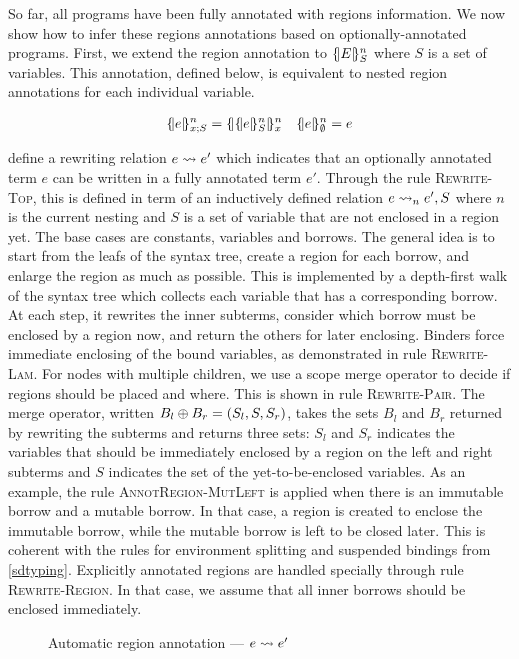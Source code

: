 So far, all \lang programs have been fully annotated with regions information.
We now show how to infer these regions annotations based on
optionally-annotated programs.
First, we extend the region annotation to $\region{S}{E}$ where $S$ is
a set of variables. This annotation, defined below, is equivalent to nested
region annotations for each individual variable.

\begin{align*}
  \region{x;S}{e} &= \region{x}{\region{S}{e}}& \region{\emptyset}{e} &= e\\
\end{align*}

 define a rewriting relation $\RannotT{e}{e'}$
which indicates that an optionally annotated term $e$ can be written
in a fully annotated term $e'$.
Through the rule \textsc{Rewrite-Top}, this is defined
in term of an inductively defined relation
$\Rannot{e}{e'}{S}$ where $n$ is the current nesting and $S$ is a set of
variable that are not enclosed in a region yet.
The base cases are constants, variables and borrows.
The general idea is to start from the leafs of the syntax tree, create a
region for each borrow, and enlarge the region as much as possible.
This is implemented by a depth-first walk of the syntax
tree which collects each variable that has a corresponding borrow.
At each step, it rewrites the inner subterms,
consider which borrow must be enclosed by a region now, and
return the others for later enclosing. Binders force immediate
enclosing of the bound variables, as demonstrated in rule \textsc{Rewrite-Lam}.
For nodes with multiple children, we
use a scope merge operator to decide if regions should be placed and where.
This is shown in rule \textsc{Rewrite-Pair}.
The merge operator, written $\getBorrows{B_l}{B_r}{(S_l,S,S_r)}$, takes
the sets $B_l$ and $B_r$ returned by rewriting the subterms
and returns three sets: $S_l$ and $S_r$ indicates the variables
that should be immediately enclosed by a region on the left and right
subterms and $S$ indicates the set of the yet-to-be-enclosed variables.
As an example, the rule \textsc{AnnotRegion-MutLeft} is applied
when there is an immutable borrow and a mutable borrow. In that case, a
region is created to enclose the immutable borrow, while the mutable
borrow is left to be closed later. This is coherent with the rules
for environment splitting and suspended bindings from \cref{sdtyping}.
%
Explicitly annotated regions are handled specially through
rule \textsc{Rewrite-Region}. In that case, we assume that all inner
borrows should be enclosed immediately.

\begin{figure*}[!hbt]
  \centering
  
  \caption{Automatic region annotation --- $\RannotT{e}{e'}$}
  \label{fig:region-annotation}
\end{figure*}

